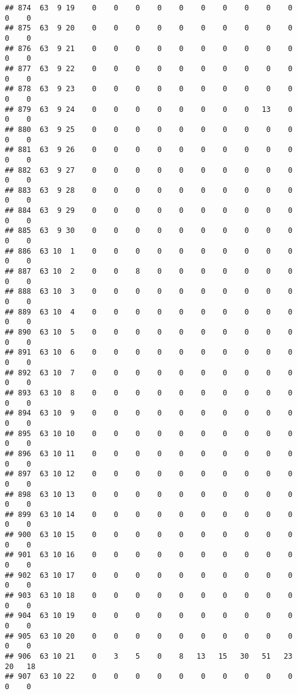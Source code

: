 \documentclass[]{article}
\begin{document}
\begin{verbatim}
## 874  63  9 19    0    0    0    0    0    0    0    0    0    0    0    0
## 875  63  9 20    0    0    0    0    0    0    0    0    0    0    0    0
## 876  63  9 21    0    0    0    0    0    0    0    0    0    0    0    0
## 877  63  9 22    0    0    0    0    0    0    0    0    0    0    0    0
## 878  63  9 23    0    0    0    0    0    0    0    0    0    0    0    0
## 879  63  9 24    0    0    0    0    0    0    0    0   13    0    0    0
## 880  63  9 25    0    0    0    0    0    0    0    0    0    0    0    0
## 881  63  9 26    0    0    0    0    0    0    0    0    0    0    0    0
## 882  63  9 27    0    0    0    0    0    0    0    0    0    0    0    0
## 883  63  9 28    0    0    0    0    0    0    0    0    0    0    0    0
## 884  63  9 29    0    0    0    0    0    0    0    0    0    0    0    0
## 885  63  9 30    0    0    0    0    0    0    0    0    0    0    0    0
## 886  63 10  1    0    0    0    0    0    0    0    0    0    0    0    0
## 887  63 10  2    0    0    8    0    0    0    0    0    0    0    0    0
## 888  63 10  3    0    0    0    0    0    0    0    0    0    0    0    0
## 889  63 10  4    0    0    0    0    0    0    0    0    0    0    0    0
## 890  63 10  5    0    0    0    0    0    0    0    0    0    0    0    0
## 891  63 10  6    0    0    0    0    0    0    0    0    0    0    0    0
## 892  63 10  7    0    0    0    0    0    0    0    0    0    0    0    0
## 893  63 10  8    0    0    0    0    0    0    0    0    0    0    0    0
## 894  63 10  9    0    0    0    0    0    0    0    0    0    0    0    0
## 895  63 10 10    0    0    0    0    0    0    0    0    0    0    0    0
## 896  63 10 11    0    0    0    0    0    0    0    0    0    0    0    0
## 897  63 10 12    0    0    0    0    0    0    0    0    0    0    0    0
## 898  63 10 13    0    0    0    0    0    0    0    0    0    0    0    0
## 899  63 10 14    0    0    0    0    0    0    0    0    0    0    0    0
## 900  63 10 15    0    0    0    0    0    0    0    0    0    0    0    0
## 901  63 10 16    0    0    0    0    0    0    0    0    0    0    0    0
## 902  63 10 17    0    0    0    0    0    0    0    0    0    0    0    0
## 903  63 10 18    0    0    0    0    0    0    0    0    0    0    0    0
## 904  63 10 19    0    0    0    0    0    0    0    0    0    0    0    0
## 905  63 10 20    0    0    0    0    0    0    0    0    0    0    0    0
## 906  63 10 21    0    3    5    0    8   13   15   30   51   23   20   18
## 907  63 10 22    0    0    0    0    0    0    0    0    0    0    0    0

\end{verbatim}
\end{document}
